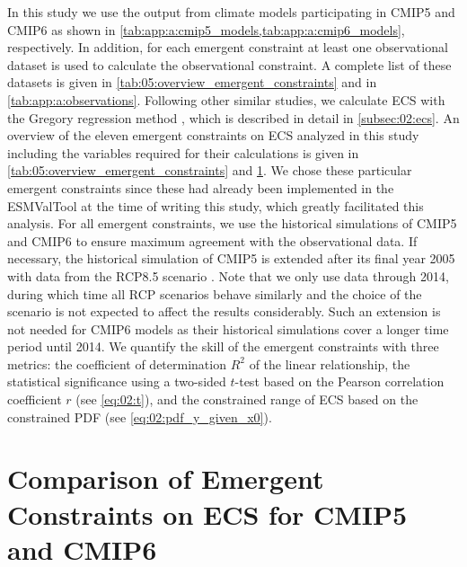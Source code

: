 In this study we use the output from climate models participating in
\acs{CMIP}5 and \acs{CMIP}6 as shown in
\cref{tab:app:a:cmip5_models,tab:app:a:cmip6_models}, respectively. In
addition, for each emergent constraint at least one observational dataset is
used to calculate the observational constraint. A complete list of these
datasets is given in \cref{tab:05:overview_emergent_constraints} and in
\cref{tab:app:a:observations}. Following other similar studies, we calculate
\ac{ECS} with the Gregory regression method \autocite{Gregory2004}, which is
described in detail in \cref{subsec:02:ecs}. An overview of the eleven emergent
constraints on \ac{ECS} analyzed in this study including the variables required
for their calculations is given in \cref{tab:05:overview_emergent_constraints}
and \cref{sec:05:comparison_of_emergent_constraints}. We chose these particular
emergent constraints since these had already been implemented in the
\ac{ESMValTool} at the time of writing this study, which greatly facilitated
this analysis. For all emergent constraints, we use the historical simulations
of \acs{CMIP}5 and \acs{CMIP}6 to ensure maximum agreement with the
observational data. If necessary, the historical simulation of \acs{CMIP}5 is
extended after its final year 2005 with data from the \acs{RCP}8.5 scenario
\autocite{Riahi2011}. Note that we only use data through 2014, during which
time all \ac{RCP} scenarios behave similarly and the choice of the scenario is
not expected to affect the results considerably. Such an extension is not
needed for \acs{CMIP}6 models as their historical simulations cover a longer
time period until 2014. We quantify the skill of the emergent constraints with
three metrics: the coefficient of determination $R^2$ of the linear
relationship, the statistical significance using a two-sided $t$-test based on
the Pearson correlation coefficient $r$ (see \cref{eq:02:t}), and the
constrained range of \ac{ECS} based on the constrained \ac{PDF} (see
\cref{eq:02:pdf_y_given_x0}).


\section{Comparison of Emergent Constraints on \acs{ECS} for \acs{CMIP}5 and
  \acs{CMIP}6}
\label{sec:05:comparison_of_emergent_constraints}

